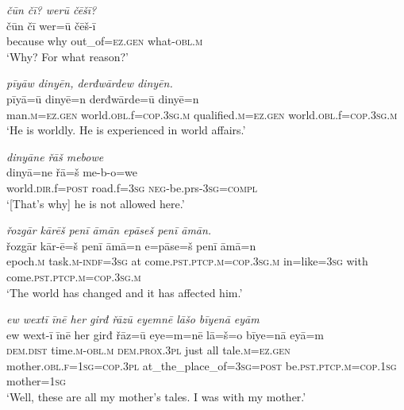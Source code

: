 \ea \label{ŠJ.106}
\textit{čūn čī? werū čēšī?} \\ 
\gll čūn čī wer=ū čēš-ī \\ 
 because why out\_of\textsc{=ez.gen} what\textsc{-obl}\textsc{.m} \\ 
\glt `Why? For what reason?'
\z 
 
\ea \label{ŠJ.107}
\textit{pīyāw dinyēn, derđwārdew dinyēn.} \\ 
\gll pīyā=ū dinyē=n derđwārde=ū dinyē=n \\ 
 man\textsc{.m}\textsc{=ez.gen} world\textsc{.obl}.f\textsc{=cop}\textsc{.3sg}\textsc{.m} qualified\textsc{.m}\textsc{=ez.gen} world\textsc{.obl}.f\textsc{=cop}\textsc{.3sg}\textsc{.m} \\ 
\glt `He is worldly. He is experienced in world affairs.'
\z 
 
\ea \label{ŠJ.108}
\textit{dinyāne řāš mebowe} \\ 
\gll dinyā=ne řā=š me-b-o=we \\ 
 world\textsc{.dir}.f\textsc{=\textsc{post}} road.f\textsc{=3sg} \textsc{neg-}be.prs\textsc{-3sg}\textsc{=compl} \\ 
\glt `[That’s why] he is not allowed here.'
\z 
 
\ea \label{ŠJ.109}
\textit{řozgār kārēš penī āmān epāseš penī āmān.} \\ 
\gll řozgār kār-ē=š penī āmā=n e=pāse=š penī āmā=n \\ 
 epoch\textsc{.m} task\textsc{.m}\textsc{-indf}\textsc{=3sg} at come\textsc{.pst}\textsc{.ptcp}\textsc{.m}\textsc{=cop}\textsc{.3sg}\textsc{.m} in=like\textsc{=3sg} with come\textsc{.pst}\textsc{.ptcp}\textsc{.m}\textsc{=cop}\textsc{.3sg}\textsc{.m} \\ 
\glt `The world has changed and it has affected him.'
\z 
 

\ea \label{KŠ.1}
\textit{ew wextī īnē her girđ řāzū eyemnē lāšo bīyenā eyām} \\ 
\gll ew wext-ī īnē her girđ řāz=ū eye=m=nē lā=š=o bīye=nā eyā=m \\ 
 \textsc{dem.dist} time\textsc{.m}\textsc{-obl}\textsc{.m} \textsc{dem.prox}\textsc{.3pl} just all tale\textsc{.m}\textsc{=ez.gen} mother\textsc{.obl}\textsc{.f}\textsc{=\textsc{1sg}}\textsc{=cop}\textsc{.3pl} at\_the\_place\_of\textsc{=3sg}\textsc{=\textsc{post}} be\textsc{.pst}\textsc{.ptcp}\textsc{.m}\textsc{=cop}\textsc{.\textsc{1sg}} mother\textsc{=\textsc{1sg}} \\ 
\glt `Well, these are all my mother’s tales. I was with my mother.'
\z 
 
